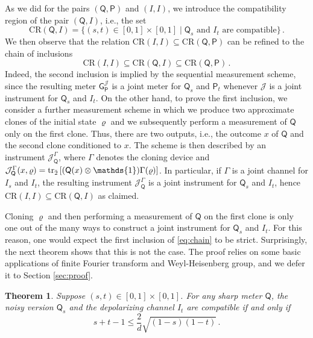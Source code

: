 \documentclass[12pt,reqno]{amsart}
\newtheorem{theorem}{Theorem}
\theoremstyle{definition}
\newcommand{\ptr}[2]{{\rm tr}_{#1} #2} %
\newcommand{\id}{\mathds{1}} %
\newcommand{\Qo}{\mathsf{Q}}%
\newcommand{\Po}{\mathsf{P}}%
\newcommand{\Go}{\mathsf{G}}%
\newcommand{\rhoo}{\varrho} %
\newcommand{\ii}{\mathcal{J}}
\newcommand{\CR}[1]{\textrm{CR} #1} %
\begin{document}
As we did for the pairs $(\Qo,\Po)$ and $(I,I)$, we introduce the compatibility region of the pair $(\Qo,I)$, i.e., the set
\begin{equation*}
\CR{(\Qo,I)} = \{(s,t) \in [0,1]\times [0,1] \mid \Qo_s \text{ and } I_t \text{ are compatible}\}\,.
\end{equation*}
We then observe that the relation $\CR{(I,I)}\subseteq\CR{(\Qo,\Po)}$ can be refined to the chain of inclusions
\begin{equation}\label{eq:chain}
\CR{(I,I)}\subseteq\CR{(\Qo,I)}\subseteq\CR{(\Qo,\Po)}\,.
\end{equation}
Indeed, the second inclusion is implied by the sequential measurement scheme, since the resulting meter $\Go^\ii_\Po$ is a joint meter for $\Qo_s$ and $\Po_t$ whenever $\ii$ is a joint instrument for $\Qo_s$ and $I_t$. On the other hand, to prove the first inclusion, we consider a further measurement scheme in which we produce two approximate clones of the initial state $\rhoo$ and we subsequently perform a measurement of $\Qo$ only on the first clone. Thus, there are two outputs, i.e., the outcome $x$ of $\Qo$ and the second clone conditioned to $x$. The scheme is then described by an instrument $\ii^\Gamma_\Qo$, where $\Gamma$ denotes the cloning device and $\ii^\Gamma_\Qo(x,\rhoo) = \ptr{\bar{2}}{\left[(\Qo(x)\otimes\id)\Gamma(\rhoo)\right]}$. In particular, if $\Gamma$ is a joint channel for $I_s$ and $I_t$, the resulting instrument $\ii^\Gamma_\Qo$ is a joint instrument for $\Qo_s$ and $I_t$, hence $\CR{(I,I)}\subseteq\CR{(\Qo,I)}$ as claimed.

Cloning $\rhoo$ and then performing a measurement of $\Qo$ on the first clone is only one out of the many ways to construct a joint instrument for $\Qo_s$ and $I_t$. For this reason, one would expect the first inclusion of \eqref{eq:chain} to be strict. Surprisingly, the next theorem shows that this is not the case. The
proof relies on some basic applications of finite Fourier transform and Weyl-Heisenberg group, and we defer it to Section \ref{sec:proof}.

\begin{theorem}\label{thm:main}
Suppose $(s,t)\in [0,1]\times [0,1]$. For any sharp meter $\Qo$, the noisy version $\Qo_s$ and the depolarizing channel $I_t$ are compatible if and only if
\begin{equation}\label{eq:QI_comp}
s+t-1\leq \frac{2}{d}\sqrt{(1-s)(1-t)}\, .
\end{equation}
\end{theorem}
\end{document}
